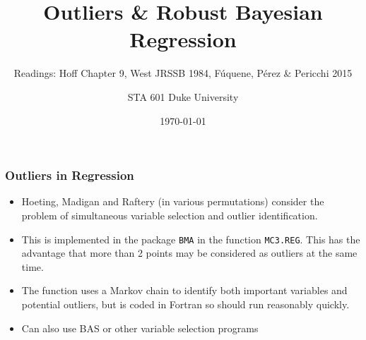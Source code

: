 \documentclass[]{beamer}\usepackage[]{graphicx}\usepackage[]{color}
\title{Outliers \& Robust Bayesian  Regression}
\author{STA 601 Duke University}
\subtitle{Readings: Hoff Chapter 9, West JRSSB 1984, F{\'{u}}quene,
    P{\'e}rez \& Pericchi 2015}
\institute{Duke University}
\date{\today}
\begin{document}
\maketitle

  \begin{frame} \frametitle{Outliers in Regression}
    \begin{itemize}
    \item Hoeting, Madigan and Raftery (in various permutations)
      consider the problem of simultaneous variable selection and
      outlier identification. \pause
\item   This is implemented in the package {\tt BMA} in the function
  {\tt MC3.REG}.
This has the advantage that more than 2 points may be considered as
outliers at the same time. \pause
\item The function uses a Markov chain to identify both important
  variables and potential outliers, but is coded in Fortran so should
  run reasonably quickly. \pause
\item Can also use BAS or other variable selection programs \pause
  \end{itemize}
  \end{frame}
\end{document}
